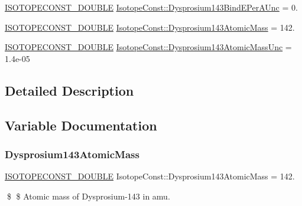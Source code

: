 \begin{DoxyCompactItemize}
\item 
\mbox{\hyperlink{group___isotope_const-_macros_ga8f45a7272ce02c0b4c65c44636ed719a}{I\+S\+O\+T\+O\+P\+E\+C\+O\+N\+S\+T\+\_\+\+D\+O\+U\+B\+LE}} \mbox{\hyperlink{group___isotope_const-_dysprosium-_dy143_gabc2829a507cfd75a8b2e2a49ebd51ddc}{Isotope\+Const\+::\+Dysprosium143\+Bind\+E\+Per\+A\+Unc}} = 0.
\item 
\mbox{\hyperlink{group___isotope_const-_macros_ga8f45a7272ce02c0b4c65c44636ed719a}{I\+S\+O\+T\+O\+P\+E\+C\+O\+N\+S\+T\+\_\+\+D\+O\+U\+B\+LE}} \mbox{\hyperlink{group___isotope_const-_dysprosium-_dy143_ga77d5985f34025edf1dd290890e4167c3}{Isotope\+Const\+::\+Dysprosium143\+Atomic\+Mass}} = 142.
\item 
\mbox{\hyperlink{group___isotope_const-_macros_ga8f45a7272ce02c0b4c65c44636ed719a}{I\+S\+O\+T\+O\+P\+E\+C\+O\+N\+S\+T\+\_\+\+D\+O\+U\+B\+LE}} \mbox{\hyperlink{group___isotope_const-_dysprosium-_dy143_ga43d1903314f6529a39c04eb0aa30e7aa}{Isotope\+Const\+::\+Dysprosium143\+Atomic\+Mass\+Unc}} = 1.\+4e-\/05
\end{DoxyCompactItemize}


\subsection{Detailed Description}


\subsection{Variable Documentation}
\mbox{\label{group___isotope_const-_dysprosium-_dy143_ga77d5985f34025edf1dd290890e4167c3}} 
\subsubsection{\texorpdfstring{Dysprosium143\+Atomic\+Mass}{Dysprosium143AtomicMass}}
{\footnotesize\ttfamily \mbox{\hyperlink{group___isotope_const-_macros_ga8f45a7272ce02c0b4c65c44636ed719a}{I\+S\+O\+T\+O\+P\+E\+C\+O\+N\+S\+T\+\_\+\+D\+O\+U\+B\+LE}} Isotope\+Const\+::\+Dysprosium143\+Atomic\+Mass = 142.}

\$ \$ Atomic mass of Dysprosium-\/143 in amu. \mbox{\label{group___isotope_const-_dysprosium-_dy143_ga43d1903314f6529a39c04eb0aa30e7aa}} 
